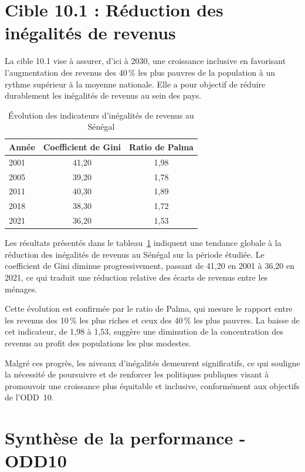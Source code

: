\section{Cible 10.1 : Réduction des inégalités de revenus}

La cible 10.1 vise à assurer, d’ici à 2030, une croissance inclusive en favorisant l’augmentation des revenus des 40\,\% les plus pauvres de la population à un rythme supérieur à la moyenne nationale. 
Elle a pour objectif de réduire durablement les inégalités de revenus au sein des pays.

\begin{table}[H]
	\centering
	\caption{Évolution des indicateurs d’inégalités de revenus au Sénégal}
	\label{tab:sdg10_ineq}
	\begin{tabular}{lcc}
		\hline
		\textbf{Année} & \textbf{Coefficient de Gini} & \textbf{Ratio de Palma} \\
		\hline
		2001 & 41,20 & 1,98 \\
		2005 & 39,20 & 1,78 \\
		2011 & 40,30 & 1,89 \\
		2018 & 38,30 & 1,72 \\
		2021 & 36,20 & 1,53 \\
		\hline
	\end{tabular}
\end{table}

Les résultats présentés dans le tableau~\ref{tab:sdg10_ineq} indiquent une tendance globale à la réduction des inégalités de revenus au Sénégal sur la période étudiée. 
Le coefficient de Gini diminue progressivement, passant de 41,20 en 2001 à 36,20 en 2021, ce qui traduit une réduction relative des écarts de revenus entre les ménages.

Cette évolution est confirmée par le ratio de Palma, qui mesure le rapport entre les revenus des 10\,\% les plus riches et ceux des 40\,\% les plus pauvres. 
La baisse de cet indicateur, de 1,98 à 1,53, suggère une diminution de la concentration des revenus au profit des populations les plus modestes.

Malgré ces progrès, les niveaux d’inégalités demeurent significatifs, ce qui souligne la nécessité de poursuivre et de renforcer les politiques publiques visant à promouvoir une croissance plus équitable et inclusive, conformément aux objectifs de l’ODD~10.

\section*{Synthèse de la performance - ODD10}

